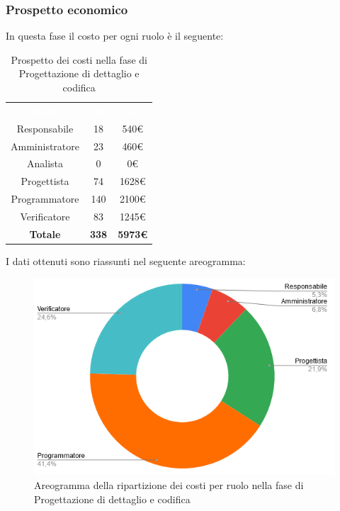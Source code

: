 \subsubsection{Prospetto economico}
In questa fase il costo per ogni ruolo è il seguente:
 
\begin{table}[H]
\centering\renewcommand{\arraystretch}{1.5}
\caption{Prospetto dei costi nella fase di Progettazione di dettaglio e codifica}
\vspace{0.2cm}
\begin{tabular}{ c c c }
\rowcolor{redafk}
\textcolor{white}{\textbf{Ruolo}} & \textcolor{white}{\textbf{Ore}} &
\textcolor{white}{\textbf{Costo}}  \\
Responsabile & 18 & 540€ \\
Amministratore & 23 & 460€ \\
Analista & 0 & 0€ \\
Progettista & 74 & 1628€ \\
Programmatore & 140 & 2100€  \\
Verificatore & 83 & 1245€  \\
\rowcolor{lastrowcolor}
\textbf{Totale} & \textbf{338} & \textbf{5973€}  \\
\end{tabular}
\end{table}
 
I dati ottenuti sono riassunti nel seguente areogramma:
\begin{figure}[H]
\centering
\includegraphics[scale=0.60]{img/grafici/torta_fase_prog_cod.png}
\caption{Areogramma della ripartizione dei costi per ruolo nella fase di Progettazione di dettaglio e codifica}
\end{figure}

